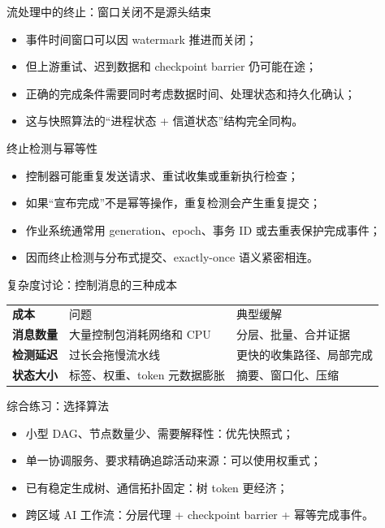 \documentclass[UTF8,fontset=none,aspectratio=169,10pt]{beamer}
\begin{document}
\begin{frame}{流处理中的终止：窗口关闭不是源头结束}
\begin{itemize}
  \item 事件时间窗口可以因 watermark 推进而关闭；
  \item 但上游重试、迟到数据和 checkpoint barrier 仍可能在途；
  \item 正确的完成条件需要同时考虑数据时间、处理状态和持久化确认；
  \item 这与快照算法的“进程状态 + 信道状态”结构完全同构。
\end{itemize}
\end{frame}

\begin{frame}{终止检测与幂等性}
\begin{itemize}
  \item 控制器可能重复发送请求、重试收集或重新执行检查；
  \item 如果“宣布完成”不是幂等操作，重复检测会产生重复提交；
  \item 作业系统通常用 generation、epoch、事务 ID 或去重表保护完成事件；
  \item 因而终止检测与分布式提交、exactly-once 语义紧密相连。
\end{itemize}
\end{frame}

\begin{frame}{复杂度讨论：控制消息的三种成本}
\begin{tabularx}{\linewidth}{>{\bfseries}p{3cm}XX}
\toprule
成本 & 问题 & 典型缓解 \\
消息数量 & 大量控制包消耗网络和 CPU & 分层、批量、合并证据 \\
检测延迟 & 过长会拖慢流水线 & 更快的收集路径、局部完成 \\
状态大小 & 标签、权重、token 元数据膨胀 & 摘要、窗口化、压缩 \\
\bottomrule
\end{tabularx}
\end{frame}

\begin{frame}{综合练习：选择算法}
\begin{itemize}
  \item 小型 DAG、节点数量少、需要解释性：优先快照式；
  \item 单一协调服务、要求精确追踪活动来源：可以使用权重式；
  \item 已有稳定生成树、通信拓扑固定：树 token 更经济；
  \item 跨区域 AI 工作流：分层代理 + checkpoint barrier + 幂等完成事件。
\end{itemize}
\vfill
{}
\end{frame}
\end{document}
